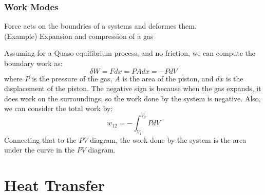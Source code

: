 \documentclass[11pt]{report}
\begin{document}
\subsection{Work Modes}
\begin{definition}
    Force acts on the boundries of a systems and deformes them. \\
    (Example) Expansion and compression of a gas 

    Assuming for a Quaso-equilibrium process, and no friction, we can compute the boundary work as:
    \begin{equation}
        \delta W = F dx  = P A dx = - P dV
    \end{equation}
    where $P$ is the pressure of the gas, $A$ is the area of the piston, and $dx$ is the displacement of the piston. The negative sign is because when the gas expands, it does work on the surroundings, so the work done by the system is negative. Also, we can consider the total work by:
    \begin{equation}
        w_{12} = -\int_{V_1}^{V_2} P dV
    \end{equation}
     Connecting that to the $PV$ diagram, the work done by the system is the area under the curve in the $PV$ diagram.
\end{definition}




\chapter{Heat Transfer}
\end{document}
